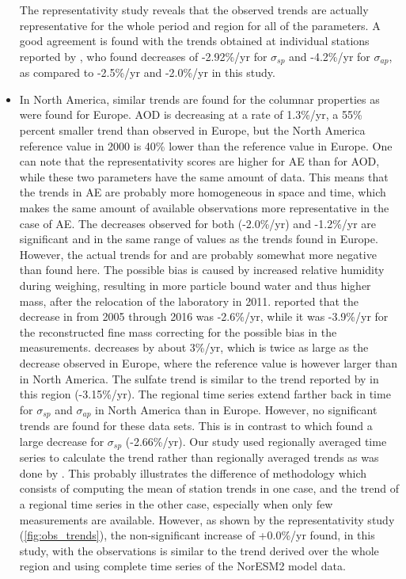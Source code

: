 \documentclass[acp, manuscript]{copernicus}
\begin{document}
\begin{itemize}
 The representativity study reveals that the observed trends are actually representative for the whole period and region for all of the parameters. A good agreement is found with the trends obtained at individual stations reported by \cite{collaudcoen-2019}, who found decreases of -2.92\%/yr for $\sigma_{sp}$ and -4.2\%/yr for $\sigma_{ap}$, as compared to -2.5\%/yr and -2.0\%/yr in this study.
 \item In North America, similar trends are found for the columnar properties as were found for Europe. AOD is decreasing at a rate of 1.3\%/yr, a 55\% percent smaller trend than observed in Europe, but the North America reference value in 2000 is 40\% lower than the reference value in Europe. One can note that the representativity scores are higher for AE than for AOD, while these two parameters have the same amount of data. This means that the trends in AE are probably more homogeneous in space and time, which makes the same amount of available observations more representative in the case of AE. The decreases observed for both  (-2.0\%/yr) and  -1.2\%/yr are significant and in the same range of values as the trends found in Europe. However, the actual trends for  and  are probably somewhat more negative than found here. The possible bias is caused by increased relative humidity during weighing, resulting in more particle bound water and thus higher mass, after the relocation of the laboratory in 2011. \cite{Hand2019} reported that the  decrease in  from 2005 through 2016 was -2.6\%/yr, while it was -3.9\%/yr for the reconstructed fine mass correcting for the possible bias in the measurements.  decreases by about 3\%/yr, which is twice as large as the decrease observed in Europe, where the reference value is however larger than in North America. The sulfate trend is similar to the trend reported by \cite{aas2019global} in this region (-3.15\%/yr). The regional time series extend farther back in time for $\sigma_{sp}$ and $\sigma_{ap}$ in North America than in Europe. However, no significant trends are found for these data sets. This is in contrast to \cite{collaudcoen-2019} which found a large decrease for $\sigma_{sp}$ (-2.66\%/yr). Our study used regionally averaged time series to calculate the trend rather than regionally averaged trends as was done by \cite{collaudcoen-2019}. This probably illustrates the difference of methodology which consists of computing the mean of station trends in one case, and the trend of a regional time series in the other case, especially when only few measurements are available. However, as shown by the representativity study (\ref{fig:obs_trends}), the non-significant increase of +0.0\%/yr found, in this study, with the observations is similar to the trend derived over the whole region and using complete time series of the NorESM2 model data.

\end{itemize}
\end{document}
